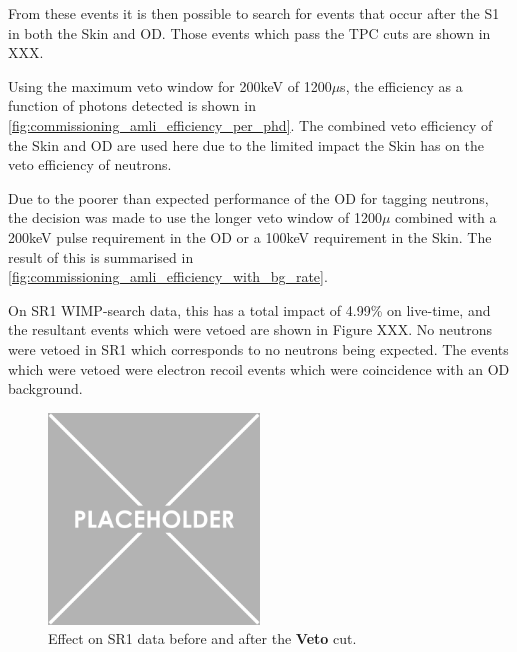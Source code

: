 \par
From these events it is then possible to search for events that occur after the S1 in both the Skin and OD.
Those events which pass the TPC cuts are shown in XXX.




\par
Using the maximum veto window for 200keV of 1200$\mu$s, the efficiency as a function of photons detected is shown in \autoref{fig:commissioning_amli_efficiency_per_phd}.
The combined veto efficiency of the Skin and OD are used here due to the limited impact the Skin has on the veto efficiency of neutrons.




\par
Due to the poorer than expected performance of the OD for tagging neutrons, the decision was made to use the longer veto window of 1200$\mu$ combined with a 200keV pulse requirement in the OD or a 100keV requirement in the Skin.
The result of this is summarised in \autoref{fig:commissioning_amli_efficiency_with_bg_rate}.




\par
On SR1 WIMP-search data, this has a total impact of 4.99\% on live-time, and the resultant events which were vetoed are shown in Figure XXX.
No neutrons were vetoed in SR1 which corresponds to no neutrons being expected.
The events which were vetoed were electron recoil events which were coincidence with an OD background.

\begin{figure}[!htbp]
    \centering
    \includegraphics[width=0.5\textwidth]{Figures/Placeholder.png}
    \caption{Effect on SR1 data before and after the \textbf{Veto} cut.}
    \label{fig:tpc_with_od_veto_in_sr1}
\end{figure}

